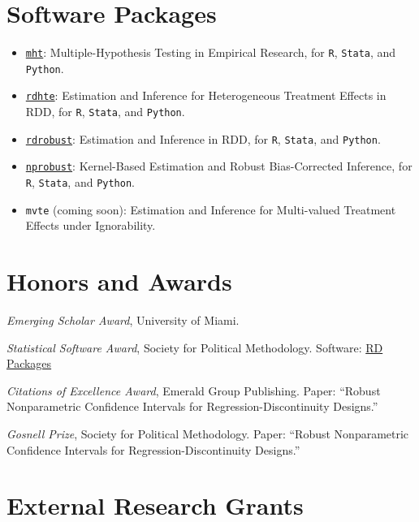 \documentclass[11pt]{article}
\let\cvsection\section
\renewcommand{\section}{\Needspace{8\baselineskip}\cvsection}
\newcommand{\subhead}[1]{\Needspace{5\baselineskip}\vspace{7pt}{\sffamily\footnotesize\bfseries\color{ink}#1}\par\vspace{1pt}}
\newcommand{\yr}[1]{{\sffamily\footnotesize\color{muted}#1}}
\begin{document}
\section{Software Packages}
\begin{itemize}[leftmargin=*]
\item \href{https://www.sebastiangaliani.com/academic-code/}{\texttt{mht}}: Multiple-Hypothesis Testing in Empirical Research, for \texttt{R}, \texttt{Stata}, and \texttt{Python}.

\item \href{https://rdpackages.github.io/rdhte/}{\texttt{rdhte}}: Estimation and Inference for Heterogeneous Treatment Effects in RDD, for \texttt{R}, \texttt{Stata}, and \texttt{Python}.

\item \href{https://rdpackages.github.io/rdrobust/}{\texttt{rdrobust}}: Estimation and Inference in RDD, for \texttt{R}, \texttt{Stata}, and \texttt{Python}.

\item \href{https://nppackages.github.io/nprobust/}{\texttt{nprobust}}: Kernel-Based Estimation and Robust Bias-Corrected Inference, for \texttt{R}, \texttt{Stata}, and \texttt{Python}.

\item \texttt{mvte} (coming soon): Estimation and Inference for Multi-valued Treatment Effects under Ignorability.
\end{itemize}


\section{Honors and Awards}
\begin{yrlist}
\item[\yr{2018}] \emph{Emerging Scholar Award}, University of Miami.
\item[\yr{2017}] \emph{Statistical Software Award}, Society for Political Methodology.
	Software: \href{https://rdpackages.github.io/}{RD Packages}
\item[\yr{2017}] \emph{Citations of Excellence Award}, Emerald Group Publishing.
	Paper: ``Robust Nonparametric Confidence Intervals for Regression-Discontinuity Designs.''
\item[\yr{2015}] \emph{Gosnell Prize}, Society for Political Methodology.
	Paper: ``Robust Nonparametric Confidence Intervals for Regression-Discontinuity Designs.''
\end{yrlist}


\section{External Research Grants}
\subhead{Active}
\end{document}
